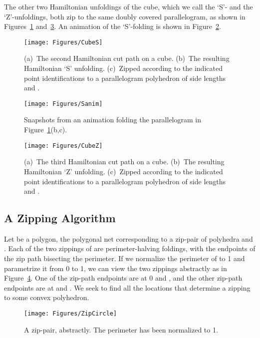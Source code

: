 \pdfoutput=1  \documentclass[]{article}
\newcommand{\figlab}[1]{\label{fig:#1}}
\newcommand{\seclab}[1]{\label{sec:#1}}
\newcommand{\figref}[1]{\ref{fig:#1}}
\begin{document}
The other two Hamiltonian unfoldings of the cube,
which we call the `S'- and the `Z'-unfoldings,
both zip to the same
doubly covered parallelogram, as shown in
Figures~\figref{CubeS} and~\figref{CubeZ}.
An animation of the `S'-folding is shown in Figure~\figref{Sanim}.
\begin{figure}[htbp]
\centering
\texttt{[image: Figures/CubeS]}
\caption{(a)~The second Hamiltonian cut path on a cube.
(b)~The resulting Hamiltonian `S' unfolding.
(c)~Zipped according to the indicated point identifications to a
parallelogram polyhedron of side lengths  and .}
\figlab{CubeS}
\end{figure}
\begin{figure}[htbp]
\centering
\texttt{[image: Figures/Sanim]}
\caption{Snapshots from an animation folding the parallelogram in
Figure~\protect\figref{CubeS}(b,c).}
\figlab{Sanim}
\end{figure}
\begin{figure}[htbp]
\centering
\texttt{[image: Figures/CubeZ]}
\caption{(a)~The third  Hamiltonian cut path on a cube.
(b)~The resulting Hamiltonian `Z' unfolding.
(c)~Zipped according to the indicated point identifications to a
parallelogram polyhedron of side lengths  and .}
\figlab{CubeZ}
\end{figure}




\subsection{A Zipping Algorithm}
\seclab{ZipIt}

Let  be a  polygon, the polygonal net corresponding to a zip-pair of
polyhedra  and .
Each of the two zippings of  are perimeter-halving foldings, with
the
endpoints of the zip path bisecting the perimeter.
If we normalize the perimeter of  to 1 and parametrize
it from 0 to 1, we can view the two
zippings
abstractly as in Figure~\figref{ZipCircle}.
One of the zip-path endpoints are at 0 and ,
and the other zip-path endpoints are at  and .
We seek to find all the locations  that determine a zipping to some
convex polyhedron.

\begin{figure}[htbp]
\centering
\texttt{[image: Figures/ZipCircle]}
\caption{A zip-pair, abstractly. The perimeter has been normalized to 1.}
\figlab{ZipCircle}
\end{figure}
\end{document}
